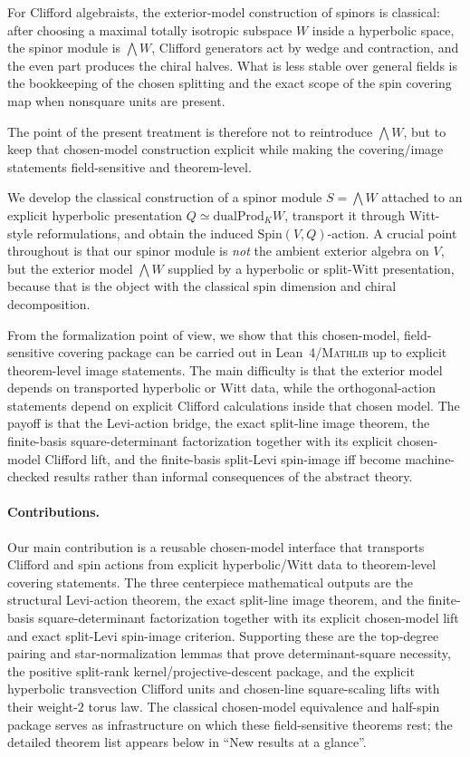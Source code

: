 \documentclass{birkjour}
\theoremstyle{plain}
\theoremstyle{definition}
\theoremstyle{remark}
\newcommand{\Spin}{\mathrm{Spin}}
\newcommand{\dualProd}{\mathrm{dualProd}}
\newcommand{\Lean}{Lean~4\xspace}
\newcommand{\Mathlib}{\textsc{Mathlib}\xspace}
\begin{document}
For Clifford algebraists, the exterior-model construction of spinors is
classical: after choosing a maximal totally isotropic subspace $W$ inside a
hyperbolic space, the spinor module is $\bigwedge W$, Clifford generators act
by wedge and contraction, and the even part produces the chiral halves. What is
less stable over general fields is the bookkeeping of the chosen splitting and
the exact scope of the spin covering map when nonsquare units are present.

The point of the present treatment is therefore not to reintroduce
$\bigwedge W$, but to keep that chosen-model construction explicit while making
the covering/image statements field-sensitive and theorem-level.

We develop the classical construction of a spinor
module $S=\bigwedge W$ attached to an explicit hyperbolic presentation
$Q \simeq \dualProd_K W$, transport it through Witt-style reformulations, and
obtain the induced $\Spin(V,Q)$-action. A crucial point throughout is that our
spinor module is \emph{not} the ambient exterior algebra on $V$, but
the exterior model $\bigwedge W$ supplied by a hyperbolic or split-Witt
presentation, because that is the object with the classical spin dimension and
chiral decomposition.

From the formalization point of view, we show that this chosen-model,
field-sensitive covering package can be carried out in \Lean/\Mathlib up to
explicit theorem-level image statements. The main
difficulty is that the exterior model depends on transported hyperbolic or Witt
data, while the orthogonal-action statements depend on explicit Clifford
calculations inside that chosen model. The payoff is that the Levi-action
bridge, the exact split-line image theorem, the finite-basis square-determinant
factorization together with its explicit chosen-model Clifford lift, and the
finite-basis split-Levi spin-image iff become machine-checked results rather
than informal consequences of the abstract theory.

\paragraph{Contributions.}
Our main contribution is a reusable chosen-model interface that transports
Clifford and spin actions from explicit hyperbolic/Witt data to theorem-level
covering statements. The three centerpiece mathematical outputs are the
structural Levi-action theorem, the exact split-line image theorem, and the
finite-basis square-determinant factorization together with its explicit
chosen-model lift and exact split-Levi spin-image criterion. Supporting these
are the top-degree pairing and star-normalization lemmas that prove
determinant-square necessity, the positive split-rank kernel/projective-descent
package, and the explicit hyperbolic transvection Clifford units and chosen-line
square-scaling lifts with their weight-$2$ torus law. The classical
chosen-model equivalence and half-spin package serves as infrastructure on
which these field-sensitive theorems rest; the detailed theorem list appears
below in ``New results at a glance''.
\end{document}
